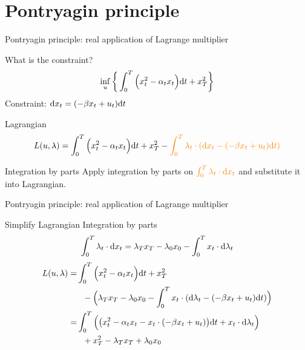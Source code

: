 \documentclass[color=usenames,dvipsnames]{beamer}
\newcommand{\dd}{\text{\normalfont d}}
\newcommand{\dt}{\text{\normalfont d}t}
\newcommand{\dx}{\text{\normalfont d}x}
\begin{document}
\section{Pontryagin principle}
\begin{frame}{Pontryagin principle: real application of Lagrange multiplier}
    \begin{block}
        {What is the constraint?}
    \begin{equation}
        \inf_{u}\bigg\{\int_0^T\Big(x_t^2 - \alpha_t x_t\Big) {{\dt}}+x_T^2\bigg\}
    \end{equation}
    Constraint: {\color{orange}${\dx}_t = (-\beta x_t + u_t ){{\dt}}$}
    \end{block}
    \begin{block}
        {Lagrangian}
        \[
        L(u,\lambda)= \int_0^T\Big(x_t^2 - \alpha_t x_t\Big) {{\dt}} +x_T^2 - {\color{orange}\int_0^T \lambda_t\cdot({\dx}_t-(-\beta x_t + u_t ){{\dt}})}
        \]
        
    \end{block}
    \begin{block}
        {Integration by parts}
        Apply integration by parts on 
        ${\color{orange}\int_0^T \lambda_t\cdot{\dx}_t}$
        and substitute it into Lagrangian.
    \end{block}
\end{frame}
\begin{frame}{Pontryagin principle: real application of Lagrange multiplier}
    \begin{block}
        {Simplify Lagrangian}
        Integration by parts
    \[
    \int_0^T \lambda_t\cdot {\dx}_t = \lambda_Tx_T-\lambda_0x_0-\int_0^T x_t\cdot {\dd}\lambda_t
    \]
        \[
        \begin{split}
        L(u,\lambda)=& \int_0^T\Big(x_t^2 - \alpha_t x_t\Big) {{\dt}}+x_T^2 \\
        &~~- \Big(\lambda_Tx_T-\lambda_0x_0 -\int_0^T x_t\cdot({\dd}\lambda_t-(-\beta x_t + u_t ){{\dt}})\Big)  \\
        =& \int_0^T\Big(\big(x_t^2 - \alpha_t x_t -x_t\cdot(-\beta x_t + u_t)\big)\dt + x_t\cdot{\dd}\lambda_t  \Big) \\
        &~~+ x_T^2- \lambda_Tx_T +\lambda_0 x_0
        \end{split}\]
        
    \end{block}
\end{frame}
\end{document}
